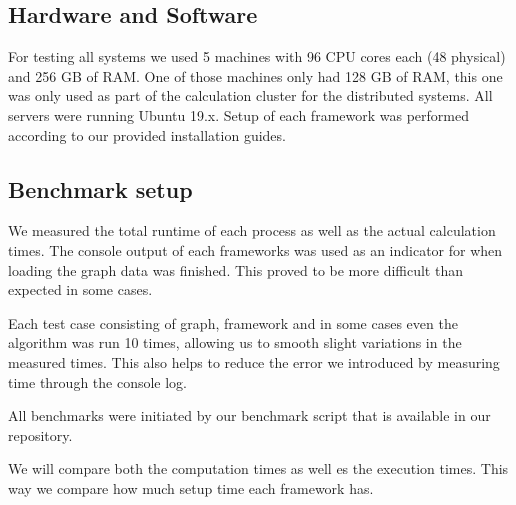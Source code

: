 \subsection{Hardware and Software}
For testing all systems we used 5 machines with 96 CPU cores each (48 physical) and 256 GB of RAM. One of those machines only had 128 GB of RAM, this one was only used as part of the calculation cluster for the distributed systems.
All servers were running Ubuntu 19.x.
Setup of each framework was performed according to our provided installation guides.


\subsection{Benchmark setup}
We measured the total runtime of each process as well as the actual calculation times. The console output of each frameworks was used as an indicator for when loading the graph data was finished. This proved to be more difficult than expected in some cases.

Each test case consisting of graph, framework and in some cases even the algorithm was run 10 times, allowing us to smooth slight variations in the measured times. This also helps to reduce the error we introduced by measuring time through the console log.

All benchmarks were initiated by our benchmark script that is available in our repository.

We will compare both the computation times as well es the execution times. This way we compare how much setup time each framework has.

 
